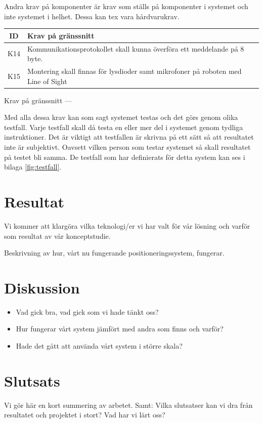 \documentclass[11pt, a4paper]{report}
\begin{document}
Andra krav på komponenter är krav som ställs på komponenter i systemet och inte systemet i helhet. Dessa kan tex vara hårdvarukrav.

\begin{center}
	\begin{tabular}{c | p{13.5cm}}
	ID & Krav på gränssnitt \\ \hline
	K14 & Kommunikationsprotokollet skall kunna överföra ett meddelande på 8 byte. \\
	K15 & Montering skall finnas för lysdioder samt mikrofoner på roboten med Line of Sight \\	
	\end{tabular}
\end{center}

Krav på gränssnitt ---

Med alla dessa krav kan som sagt systemet testas och det görs genom olika testfall. Varje testfall skall då testa en eller mer del i systemet genom tydliga instruktioner. Det är viktigt att testfallen är skrivna på ett sätt så att resultatet inte är subjektivt. Oavsett vilken person som testar systemet så skall resultatet på testet bli samma. De testfall som har definierats för detta system kan ses i bilaga \ref{fig:testfall}.


\chapter{Resultat}
Vi kommer att klargöra vilka teknologi/er vi har valt för vår lösning och varför som resultat av vår konceptstudie.

Beskrivning av hur, vårt nu fungerande positioneringssystem, fungerar. 

\chapter{Diskussion}
\begin{itemize}
\item Vad gick bra, vad gick som vi hade tänkt oss?
\item Hur fungerar vårt system jämfört med andra som finns och varför?
\item Hade det gått att använda vårt system i större skala?
\end{itemize} 




\chapter{Slutsats}
Vi gör här en kort summering av arbetet.
Samt:
Vilka slutsatser kan vi dra från resultatet och projektet i stort?
Vad har vi lärt oss?
\end{document}
